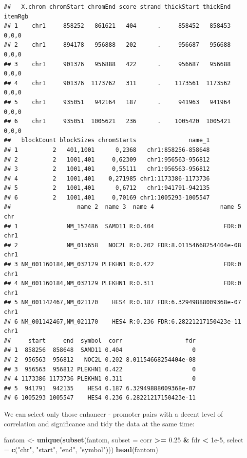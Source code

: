 \documentclass[9pt,a4paper,]{extarticle}
\newenvironment{Shaded}{\begin{snugshade}}{\end{snugshade}}
\newcommand{\KeywordTok}[1]{\textcolor[rgb]{0.13,0.29,0.53}{\textbf{#1}}}
\newcommand{\DataTypeTok}[1]{\textcolor[rgb]{0.13,0.29,0.53}{#1}}
\newcommand{\FloatTok}[1]{\textcolor[rgb]{0.00,0.00,0.81}{#1}}
\newcommand{\StringTok}[1]{\textcolor[rgb]{0.31,0.60,0.02}{#1}}
\newcommand{\OperatorTok}[1]{\textcolor[rgb]{0.81,0.36,0.00}{\textbf{#1}}}
\newcommand{\NormalTok}[1]{#1}
\begin{document}
\begin{verbatim}
##   X.chrom chromStart chromEnd score strand thickStart thickEnd itemRgb
## 1    chr1     858252   861621   404      .     858452   858453   0,0,0
## 2    chr1     894178   956888   202      .     956687   956688   0,0,0
## 3    chr1     901376   956888   422      .     956687   956688   0,0,0
## 4    chr1     901376  1173762   311      .    1173561  1173562   0,0,0
## 5    chr1     935051   942164   187      .     941963   941964   0,0,0
## 6    chr1     935051  1005621   236      .    1005420  1005421   0,0,0
##   blockCount blockSizes chromStarts               name_1
## 1          2   401,1001      0,2368   chr1:858256-858648
## 2          2   1001,401     0,62309   chr1:956563-956812
## 3          2   1001,401     0,55111   chr1:956563-956812
## 4          2   1001,401    0,271985 chr1:1173386-1173736
## 5          2   1001,401      0,6712   chr1:941791-942135
## 6          2   1001,401     0,70169 chr1:1005293-1005547
##                   name_2  name_3  name_4                   name_5  chr
## 1              NM_152486  SAMD11 R:0.404                    FDR:0 chr1
## 2              NM_015658   NOC2L R:0.202 FDR:8.01154668254404e-08 chr1
## 3 NM_001160184,NM_032129 PLEKHN1 R:0.422                    FDR:0 chr1
## 4 NM_001160184,NM_032129 PLEKHN1 R:0.311                    FDR:0 chr1
## 5 NM_001142467,NM_021170    HES4 R:0.187 FDR:6.32949888009368e-07 chr1
## 6 NM_001142467,NM_021170    HES4 R:0.236 FDR:6.28221217150423e-11 chr1
##     start     end  symbol  corr                  fdr
## 1  858256  858648  SAMD11 0.404                    0
## 2  956563  956812   NOC2L 0.202 8.01154668254404e-08
## 3  956563  956812 PLEKHN1 0.422                    0
## 4 1173386 1173736 PLEKHN1 0.311                    0
## 5  941791  942135    HES4 0.187 6.32949888009368e-07
## 6 1005293 1005547    HES4 0.236 6.28221217150423e-11
\end{verbatim}

We can select only those enhancer - promoter pairs with a decent level of correlation and significance and tidy the data at the same time:

\begin{Shaded}
\begin{Highlighting}[]
\NormalTok{fantom <-}\StringTok{ }\KeywordTok{unique}\NormalTok{(}\KeywordTok{subset}\NormalTok{(fantom, }\DataTypeTok{subset =}\NormalTok{ corr }\OperatorTok{>=}\StringTok{ }\FloatTok{0.25} \OperatorTok{&}\StringTok{ }\NormalTok{fdr }\OperatorTok{<}\StringTok{ }\FloatTok{1e-5}\NormalTok{, }\DataTypeTok{select =} \KeywordTok{c}\NormalTok{(}\StringTok{"chr"}\NormalTok{, }\StringTok{"start"}\NormalTok{, }\StringTok{"end"}\NormalTok{, }\StringTok{"symbol"}\NormalTok{)))}
\KeywordTok{head}\NormalTok{(fantom)}
\end{Highlighting}
\end{Shaded}
\end{document}
